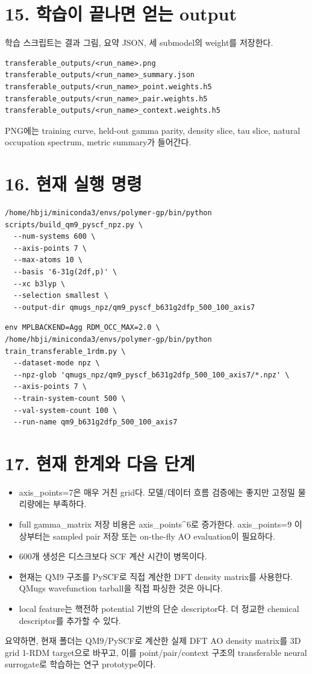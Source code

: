 \documentclass[11pt]{article}
\begin{document}
\section*{15. 학습이 끝나면 얻는 output}
학습 스크립트는 결과 그림, 요약 JSON, 세 submodel의 weight를 저장한다.
\begin{lstlisting}
transferable_outputs/<run_name>.png
transferable_outputs/<run_name>_summary.json
transferable_outputs/<run_name>_point.weights.h5
transferable_outputs/<run_name>_pair.weights.h5
transferable_outputs/<run_name>_context.weights.h5
\end{lstlisting}
PNG에는 training curve, held-out gamma parity, density slice, tau slice, natural occupation spectrum, metric summary가 들어간다.
\section*{16. 현재 실행 명령}
\begin{lstlisting}
/home/hbji/miniconda3/envs/polymer-gp/bin/python scripts/build_qm9_pyscf_npz.py \
  --num-systems 600 \
  --axis-points 7 \
  --max-atoms 10 \
  --basis '6-31g(2df,p)' \
  --xc b3lyp \
  --selection smallest \
  --output-dir qmugs_npz/qm9_pyscf_b631g2dfp_500_100_axis7
\end{lstlisting}
\begin{lstlisting}
env MPLBACKEND=Agg RDM_OCC_MAX=2.0 \
/home/hbji/miniconda3/envs/polymer-gp/bin/python train_transferable_1rdm.py \
  --dataset-mode npz \
  --npz-glob 'qmugs_npz/qm9_pyscf_b631g2dfp_500_100_axis7/*.npz' \
  --axis-points 7 \
  --train-system-count 500 \
  --val-system-count 100 \
  --run-name qm9_b631g2dfp_500_100_axis7
\end{lstlisting}
\section*{17. 현재 한계와 다음 단계}
\begin{itemize}[leftmargin=1.5em]
\item axis\_points=7은 매우 거친 grid다. 모델/데이터 흐름 검증에는 좋지만 고정밀 물리량에는 부족하다.
\item full gamma\_matrix 저장 비용은 axis\_points^6로 증가한다. axis\_points=9 이상부터는 sampled pair 저장 또는 on-the-fly AO evaluation이 필요하다.
\item 600개 생성은 디스크보다 SCF 계산 시간이 병목이다.
\item 현재는 QM9 구조를 PySCF로 직접 계산한 DFT density matrix를 사용한다. QMugs wavefunction tarball을 직접 파싱한 것은 아니다.
\item local feature는 핵전하 potential 기반의 단순 descriptor다. 더 정교한 chemical descriptor를 추가할 수 있다.
\end{itemize}
요약하면, 현재 폴더는 QM9/PySCF로 계산한 실제 DFT AO density matrix를 3D grid 1-RDM target으로 바꾸고, 이를 point/pair/context 구조의 transferable neural surrogate로 학습하는 연구 prototype이다.
\end{document}
